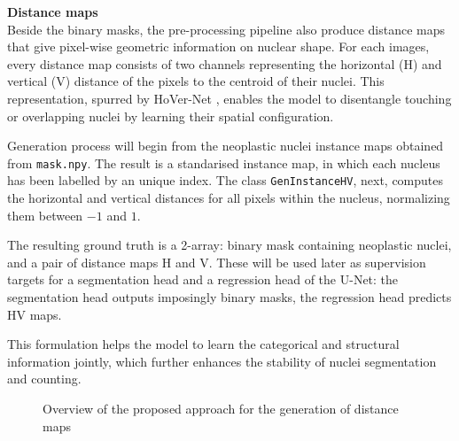 \documentclass[target=bach,aauheader=,style=]{thud}
\begin{document}
\noindent\textbf{Distance maps}\\
Beside the binary masks, the pre-processing pipeline also produce distance maps that give pixel-wise geometric information on nuclear shape. For each images, every distance map consists of two channels representing the horizontal (H) and vertical (V) distance of the pixels to the centroid of their nuclei. This representation, spurred by HoVer-Net \cite{graham2019hovernet}, enables the model to disentangle touching or overlapping nuclei by learning their spatial configuration.

Generation process will begin from the neoplastic nuclei instance maps obtained from \texttt{mask.npy}. The result is a standarised instance map, in which each nucleus has been labelled by an unique index. The class \texttt{GenInstanceHV}, next, computes the horizontal and vertical distances for all pixels within the nucleus, normalizing them between $-1$ and $1$.

The resulting ground truth is a 2-array: binary mask containing neoplastic nuclei, and a pair of distance maps H and V. These will be used later as supervision targets for a segmentation head and a regression head of the U-Net: the segmentation head outputs imposingly binary masks, the regression head predicts HV maps.

This formulation helps the model to learn the categorical and structural information jointly, which further enhances the stability of nuclei segmentation and counting.
\begin{figure}[htbp] %
\centering
{}
\caption{Overview of the proposed approach for the generation of distance maps}
\label{fig:esempio}
\end{figure}
\end{document}
